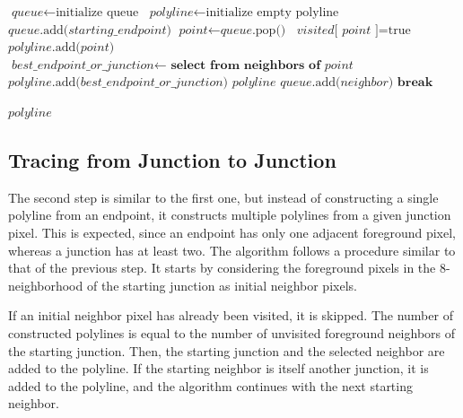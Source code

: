 {
	\begin{algorithmic}[1]
		\State $\textit{queue} \gets \text{initialize queue}$
		\State $\textit{polyline} \gets \text{initialize empty polyline}$
		\State
		\State $\textit{queue}\text{.add(}\textit{starting\_endpoint}\text{)}$
		\State $\textit{point} \gets \textit{queue}\text{.pop()}$ 
		\State
		\State $\textit{visited}\text{[}\textit{ point }\text{]} = \text{true}$
		\State $\textit{polyline}\text{.add(}\textit{point}\text{)}$
		\State
		\State $\textit{best\_endpoint\_or\_junction}\gets\textbf{ select from neighbors of }\textit{point}$
		\State $\textit{polyline}\text{.add(}\textit{best\_endpoint\_or\_junction}\text{)}$
		\State
		\Return $\textit{polyline}$
		\EndIf
		\State
		\State $\textit{queue}\text{.add(}\textit{neighbor}\text{)}$
		\State $\textbf{break}$
		\EndIf
		\EndFor
		\EndWhile
		
		\State
		\State
		\Return $\textit{polyline}$
		\EndProcedure
	\end{algorithmic}
}


\subsection{Tracing from Junction to Junction}

The second step is similar to the first one, but instead of constructing a single polyline from an endpoint, it constructs multiple polylines from a given junction pixel. This is expected, since an endpoint has only one adjacent foreground pixel, whereas a junction has at least two. The algorithm follows a procedure similar to that of the previous step. It starts by considering the foreground pixels in the 8-neighborhood of the starting junction as initial neighbor pixels.

If an initial neighbor pixel has already been visited, it is skipped. The number of constructed polylines is equal to the number of unvisited foreground neighbors of the starting junction. Then, the starting junction and the selected neighbor are added to the polyline. If the starting neighbor is itself another junction, it is added to the polyline, and the algorithm continues with the next starting neighbor.

